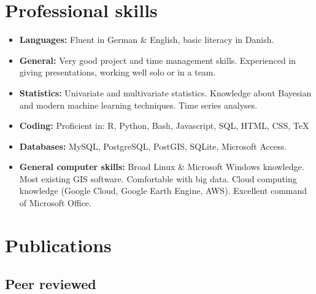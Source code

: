 \documentclass[12pt,a4paper,serif]{moderncv}        %
\makeatletter
\renewcommand*{\bibliographyitemlabel}{\@biblabel{\arabic{enumiv}} }
\renewcommand*{\bibliographyitemlabel}{\textbf{\arabic{enumiv}}}%
\makeatother
\begin{document}

\section{Professional skills}

\vspace{6pt}

\begin{itemize}

\item \textbf{Languages:} Fluent in German \& English, basic literacy in Danish.
\item \textbf{General:} Very good project and time management skills. Experienced in giving presentations, working well solo or in a team.
\item \textbf{Statistics:} Univariate and multivariate statistics. Knowledge about Bayesian and modern machine learning techniques. Time series analyses.
\item \textbf{Coding:} Proficient in: R, Python, Bash, Javascript, SQL, HTML, CSS, TeX
\item \textbf{Databases:} MySQL, PostgreSQL, PostGIS, SQLite, Microsoft Access.
\item \textbf{General computer skills:} Broad Linux \& Microsoft Windows knowledge. Most existing GIS software. Comfortable with big data. Cloud computing knowledge (Google Cloud, Google Earth Engine, AWS). Excellent command of Microsoft Office.

\end{itemize}


%
\section{Publications}

\subsection{Peer reviewed}
\end{document}
